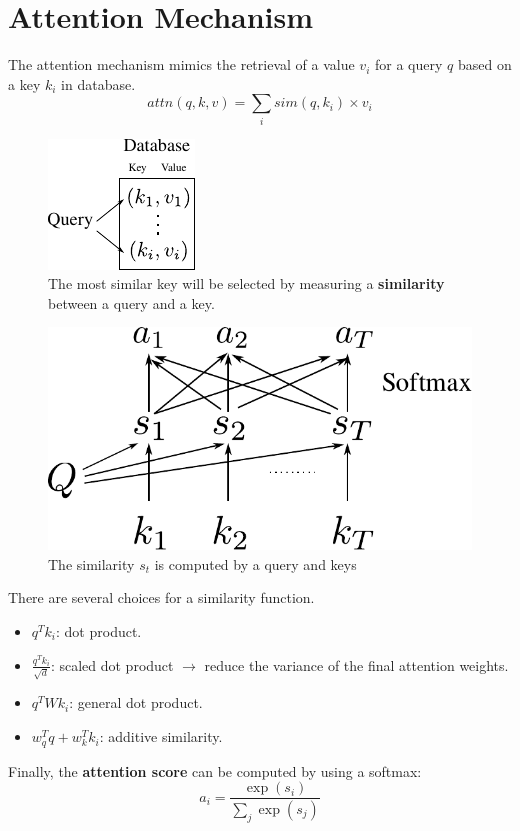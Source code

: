 \section{Attention Mechanism}
\label{sec:nlp_attention}
The attention mechanism mimics the retrieval of a value $v_i$ for a query $q$ based on a key $k_i$ in database.
$$attn(q, k, v) = \sum_i sim(q,k_i)\times v_i$$
\begin{figure}[h]
	\centering
	\includegraphics[scale=1.8]{./images/transformer/attention_database.pdf}
	\caption{The most similar key will be selected by measuring a \textbf{similarity} between a query and a key.}
\end{figure}

\begin{figure}[h]
	\centering
	\includegraphics[scale=0.6]{./images/transformer/attention.pdf}
	\caption{The similarity $s_t$ is computed by a query and keys}
\end{figure}
There are several choices for a similarity function.
\begin{itemize}
	\item $q^Tk_i$: dot product.
	\item $\frac{q^Tk_i}{\sqrt{d}}$: scaled dot product $\to$ reduce the variance of the final attention weights. 
	\item $q^TWk_i$: general dot product.
	\item $w_q^Tq+ w_k^Tk_i$: additive similarity.
\end{itemize}
Finally, the \textbf{attention score} can be computed by using a softmax:
$$a_i = \frac{\exp(s_i)}{\sum_j \exp(s_j)}$$

